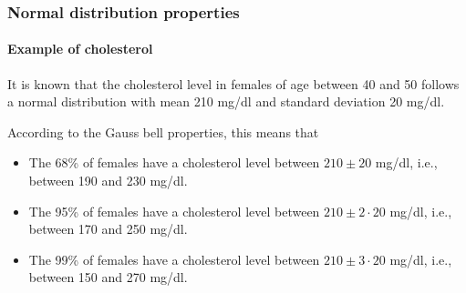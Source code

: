 \begin{frame}
\frametitle{Normal distribution properties}
\framesubtitle{Example of cholesterol}
It is known that the cholesterol level in females of age between 40 and 50 follows a normal distribution with mean 210 mg/dl and standard deviation 20 mg/dl. 

According to the Gauss bell properties, this means that
\begin{itemize}
\item The 68\% of females have a cholesterol level between $210\pm 20$ mg/dl, i.e., between 190 and 230 mg/dl.
\item The 95\% of females have a cholesterol level between $210\pm 2\cdot 20$ mg/dl, i.e., between  170 and 250 mg/dl.
\item The 99\% of females have a cholesterol level between $210\pm 3\cdot 20$ mg/dl, i.e., between  150 and 270 mg/dl.
\end{itemize}
\end{frame}


